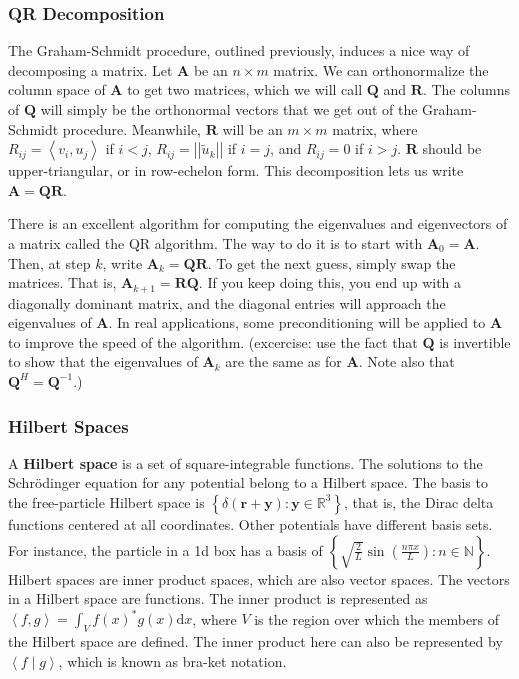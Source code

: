 \documentclass[10pt]{beamer}
\begin{document}
\begin{frame}
  \frametitle{QR Decomposition}
  The Graham-Schmidt procedure, outlined previously, induces a nice way of decomposing a matrix. Let $\mathbf{A}$ be an $n\times m$ matrix. We can orthonormalize the column space of $\mathbf{A}$ to get two matrices, which we will call $\mathbf{Q}$ and $\mathbf{R}$. The columns of $\mathbf{Q}$ will simply be the orthonormal vectors that we get out of the Graham-Schmidt procedure. Meanwhile, $\mathbf{R}$ will be an $m \times m$ matrix, where $R_{ij} = \left<v_i, u_j\right>$ if $i < j$, $R_{ij} = \left|\left|\tilde{u}_k\right|\right|$ if $i = j$, and $R_{ij} = 0$ if $i > j$. $\mathbf{R}$ should be upper-triangular, or in row-echelon form. This decomposition lets us write $\mathbf{A} = \mathbf{QR}$.

  There is an excellent algorithm for computing the eigenvalues and eigenvectors of a matrix called the QR algorithm. The way to do it is to start with $\mathbf{A}_0 = \mathbf{A}$. Then, at step $k$, write $\mathbf{A}_{k} = \mathbf{QR}$. To get the next guess, simply swap the matrices. That is, $\mathbf{A}_{k + 1} = \mathbf{RQ}$. If you keep doing this, you end up with a diagonally dominant matrix, and the diagonal entries will approach the eigenvalues of $\mathbf{A}$. In real applications, some preconditioning will be applied to $\mathbf{A}$ to improve the speed of the algorithm. (excercise: use the fact that $\mathbf{Q}$ is invertible to show that the eigenvalues of $\mathbf{A}_k$ are the same as for $\mathbf{A}$. Note also that $\mathbf{Q}^H = \mathbf{Q}^{-1}$.)
\end{frame}

\begin{frame}
  \frametitle{Hilbert Spaces}
  A \textbf{Hilbert space} is a set of square-integrable functions. The solutions to the Schrödinger equation for any potential belong to a Hilbert space. The basis to the free-particle Hilbert space is $\left\{\delta(\mathbf{r} + \mathbf{y}): \mathbf{y} \in \mathbb{R}^3\right\}$, that is, the Dirac delta functions centered at all coordinates. Other potentials have different basis sets. For instance, the particle in a 1d box has a basis of $\left\{\sqrt{\frac{2}{L}}\sin\left(\frac{n\pi x}{L}\right) : n \in \mathbb{N}\right\}$. Hilbert spaces are inner product spaces, which are also vector spaces. The vectors in a Hilbert space are functions. The inner product is represented as $\left<f, g\right> = \int_Vf(x)^*g(x)\mathrm{d}x$, where $V$ is the region over which the members of the Hilbert space are defined. The inner product here can also be represented by $\left<f\middle|g\right>$, which is known as bra-ket notation.
\end{frame}
\end{document}
